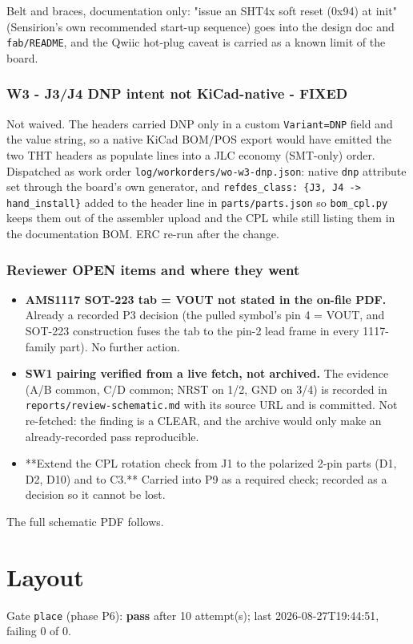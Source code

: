 \documentclass[11pt,a4paper]{article}
\begin{document}
Belt and braces, documentation only: "issue an SHT4x soft reset (0x94) at init" (Sensirion's own recommended start-up sequence) goes into the design doc and \texttt{fab/README}, and the Qwiic hot-plug caveat is carried as a known limit of the board.

\subsubsection*{W3 - J3/J4 DNP intent not KiCad-native - FIXED}
Not waived. The headers carried DNP only in a custom \texttt{Variant=DNP} field and the value string, so a native KiCad BOM/POS export would have emitted the two THT headers as populate lines into a JLC economy (SMT-only) order. Dispatched as work order \texttt{log/workorders/wo-w3-dnp.json}: native \texttt{dnp} attribute set through the board's own generator, and \texttt{refdes\_class: \{J3, J4 -\textgreater{} hand\_install\}} added to the header line in \texttt{parts/parts.json} so \texttt{bom\_cpl.py} keeps them out of the assembler upload and the CPL while still listing them in the documentation BOM. ERC re-run after the change.

\subsubsection*{Reviewer OPEN items and where they went}
\begin{itemize}
\item \textbf{AMS1117 SOT-223 tab = VOUT not stated in the on-file PDF.} Already a
recorded P3 decision (the pulled symbol's pin 4 = VOUT, and SOT-223
construction fuses the tab to the pin-2 lead frame in every 1117-family
part). No further action.
\item \textbf{SW1 pairing verified from a live fetch, not archived.} The evidence
(A/B common, C/D common; NRST on 1/2, GND on 3/4) is recorded in
\texttt{reports/review-schematic.md} with its source URL and is committed. Not
re-fetched: the finding is a CLEAR, and the archive would only make an
already-recorded pass reproducible.
\item {*}{*}Extend the CPL rotation check from J1 to the polarized 2-pin parts
(D1, D2, D10) and to C3.{*}{*} Carried into P9 as a required check; recorded
as a decision so it cannot be lost.
\end{itemize}
The full schematic PDF follows.

\section{Layout}
Gate \texttt{place} (phase P6): \textbf{pass} after 10 attempt(s); last 2026-08-27T19:44:51, failing 0 of 0.
\end{document}
